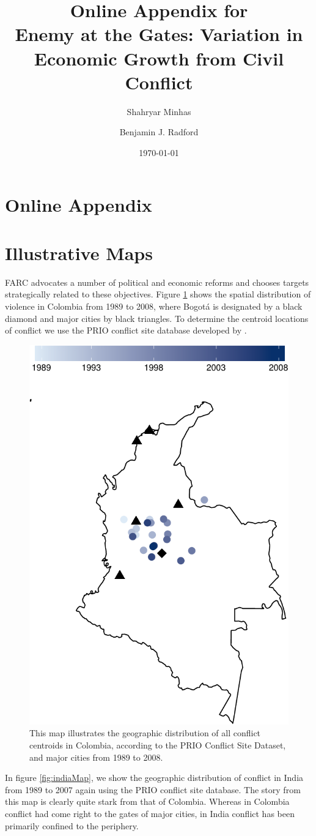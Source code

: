 \documentclass[12pt,onesided]{amsart}
\title[Enemy at the Gates]{Online Appendix for \\ Enemy at the Gates: Variation in Economic Growth from Civil Conflict}
\date{\today}
\author[Minhas]{Shahryar Minhas}
\author[Radford]{Benjamin J. Radford}
\begin{document}
\maketitle

\newpage
\newpage\setcounter{page}{1} 

\newpage
\section*{Online Appendix}
\label{online_appendix}

\section{Illustrative Maps}
\label{maps}

FARC advocates a number of political and economic reforms and chooses targets strategically related to these objectives. Figure \ref{fig:colombiaMap} shows the spatial distribution of violence in Colombia from 1989 to 2008, where Bogot\'{a} is designated by a black diamond and major cities by black triangles. To determine the centroid locations of conflict we use the PRIO conflict site database developed by \citet{hallberg:2012}. 

\begin{figure}[ht]
	\centering
	\includegraphics[width=.45\textwidth]{colombiaMap-crop}
	\caption{This map illustrates the geographic distribution of all conflict centroids in Colombia, according to the PRIO Conflict Site Dataset, and major cities from 1989 to 2008.}
	\label{fig:colombiaMap}
\end{figure}

\newpage
In figure \ref{fig:indiaMap}, we show the geographic distribution of conflict in India from 1989 to 2007 again using the PRIO conflict site database. The story from this map is clearly quite stark from that of Colombia. Whereas in Colombia conflict had come right to the gates of major cities, in India conflict has been primarily confined to the periphery.
\end{document}
